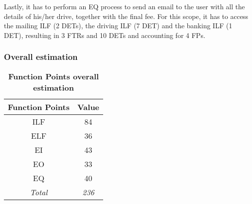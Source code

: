 Lastly, it has to perform an EQ process to send an email to the user with all the details of his/her drive, together with the final fee. For this scope, it has to access the mailing ILF (2 DETs), the driving ILF (7 DET) and the banking ILF (1 DET), resulting in 3 FTRs and 10 DETs and accounting for 4 FPs.


\subsubsection{Overall estimation}
\begin{longtable}{| c | c |}
	\caption{\textbf{Function Points overall estimation}} %
	\label{tab:fp_results}%
	\\ \hline %
	
	\textbf{Function Points } & \textbf{Value} \\ \hline
	ILF & 84 \\ \hline
	ELF & 36 \\ \hline
	EI & 43 \\ \hline
	EO & 33 \\ \hline
	EQ & 40 \\ \hline
	\emph{Total} & \emph{236} \\ \hline
\end{longtable}